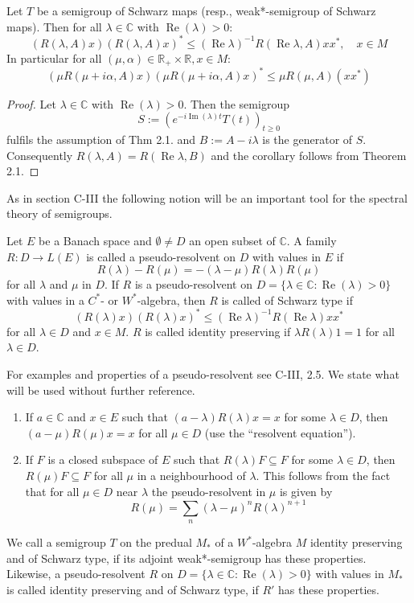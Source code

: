 \begin{corollary} 
Let $T$ be a semigroup of Schwarz maps (resp., weak*-semigroup of Schwarz maps).
Then for all $\lambda \in \mathbb{C}$ with $\operatorname{Re}(\lambda)>0$:
\[
(R(\lambda, A)x)(R(\lambda, A)x)^{*} \leq (\operatorname{Re}\lambda)^{-1} R(\operatorname{Re}\lambda, A)xx^{*}, \quad x \in M
\]
In particular for all $(\mu, \alpha) \in \mathbb{R}_{+} \times \mathbb{R}, x \in M$:
\[
(\mu R(\mu+i\alpha, A)x)(\mu R(\mu+i\alpha, A)x)^{*} \leq \mu R(\mu, A)(xx^{*})
\]
\end{corollary}
\begin{proof}
Let $\lambda \in \mathbb{C}$ with $\operatorname{Re}(\lambda)>0$.
Then the semigroup
\[
S := (e^{-i\operatorname{Im}(\lambda)t}T(t))_{t \geq 0}
\]
fulfils the assumption of Thm 2.1. and $B := A-i\lambda$ is the generator of $S$.
Consequently $R(\lambda, A)=R(\operatorname{Re}\lambda, B)$ and the corollary follows from Theorem 2.1.
\end{proof}
As in section C-III the following notion will be an important tool for the spectral theory of semigroups.
\begin{definition} 
Let $E$ be a Banach space and $\emptyset \neq D$ an open subset of $\mathbb{C}$.
A family $R: D \rightarrow L(E)$ is called a pseudo-resolvent on $D$ with values in $E$ if
\[
R(\lambda)-R(\mu)=-(\lambda-\mu)R(\lambda)R(\mu)
\]
for all $\lambda$ and $\mu$ in $D$.
If $R$ is a pseudo-resolvent on $D=\{\lambda \in \mathbb{C}: \operatorname{Re}(\lambda) > 0\}$ with values in a $C^{*}$- or $W^{*}$-algebra, then $R$ is called of Schwarz type if
\[
(R(\lambda)x)(R(\lambda)x)^{*} \leq (\operatorname{Re}\lambda)^{-1}R(\operatorname{Re}\lambda)xx^{*}
\]
for all $\lambda \in D$ and $x \in M$.
$R$ is called identity preserving if $\lambda R(\lambda)1 = 1$ for all $\lambda \in D$.
\end{definition}
For examples and properties of a pseudo-resolvent see C-III, 2.5.
We state what will be used without further reference.
\begin{enumerate}
\item
If $a \in \mathbb{C}$ and $x \in E$ such that $(a-\lambda)R(\lambda)x = x$ for some $\lambda \in D$, then $(a-\mu)R(\mu)x = x$ for all $\mu \in D$ (use the \enquote{resolvent equation}).

\item
If $F$ is a closed subspace of $E$ such that $R(\lambda)F \subseteq F$ for some $\lambda \in D$, then $R(\mu)F \subseteq F$ for all $\mu$ in a neighbourhood of $\lambda$.
This follows from the fact that for all $\mu \in D$ near $\lambda$ the pseudo-resolvent in $\mu$ is given by
\[
R(\mu) = \sum_{n}(\lambda-\mu)^n R(\lambda)^{n+1}
\]
\end{enumerate}
\begin{definition} 
We call a semigroup $T$ on the predual $M_{*}$ of a $W^{*}$-algebra $M$ identity preserving and of Schwarz type, if its adjoint weak*-semigroup has these properties.
Likewise, a pseudo-resolvent $R$ on $D=\{\lambda \in \mathbb{C}: \operatorname{Re}(\lambda)>0\}$ with values in $M_{*}$ is called identity preserving and of Schwarz type, if $R'$ has these properties.
\end{definition}
